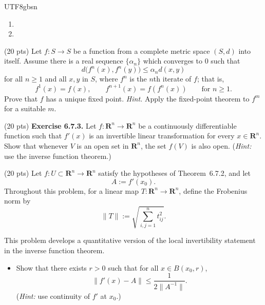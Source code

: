 \documentclass[addpoints]{exam}
\theoremstyle{definition}
\begin{document}
\begin{CJK*}{UTF8}{gbsn}
\begin{questions}
\begin{solution}

\begin{enumerate}
\item[(a)] 



\bigskip
\item[(b)] 




\end{enumerate} 
\end{solution}

\question (20 pts) Let \(f:S\to S\) be a function from a complete metric space \((S,d)\) into itself. Assume there is a real sequence \(\{\alpha_n\}\) which converges to \(0\) such that
\[
d\bigl(f^n(x),f^n(y)\bigr)\le \alpha_n d(x,y)
\]
for all \(n\ge 1\) and all \(x,y\) in \(S\), where \(f^n\) is the \(n\)th iterate of \(f\); that is,
\[
f^1(x)=f(x),\qquad f^{n+1}(x)=f(f^n(x)) \qquad \text{for } n\ge 1.
\]
Prove that \(f\) has a unique fixed point. \emph{Hint.} Apply the fixed-point theorem to \(f^m\) for a suitable \(m\).


\begin{solution} 
 
 \end{solution}

\question (20 pts) \textbf{Exercise 6.7.3.}
Let $f:\mathbf{R}^n\to\mathbf{R}^n$ be a continuously differentiable function such that
$f'(x)$ is an invertible linear transformation for every $x\in\mathbf{R}^n$.
Show that whenever $V$ is an open set in $\mathbf{R}^n$, the set $f(V)$ is also open.
(\emph{Hint:} use the inverse function theorem.)


\begin{solution} 

\end{solution}

\question (20 pts) Let \(f:U\subset \mathbf{R}^n\to \mathbf{R}^n\) satisfy the hypotheses of Theorem~6.7.2, and let
$$
A:=f'(x_0).
$$
Throughout this problem, for a linear map \(T:\mathbf{R}^n\to \mathbf{R}^n\), define the Frobenius norm by
$$
\|T\|:=\sqrt{\sum_{i,j=1}^n t_{ij}^2}.
$$

This problem develops a quantitative version of the local invertibility statement in the inverse function theorem.

\begin{itemize}
\item[(a)] Show that there exists \(r>0\) such that for all \(x\in B(x_0,r)\),
$$
\|f'(x)-A\|\le \frac{1}{2\|A^{-1}\|}.
$$
(\emph{Hint:} use continuity of \(f'\) at \(x_0\).)


\end{itemize}
\end{questions}
\end{CJK*}
\end{document}
